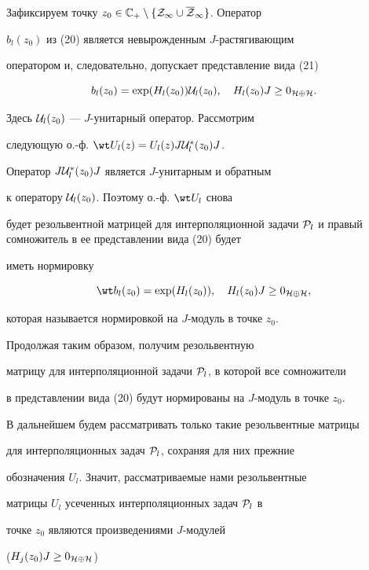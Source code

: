 Зафиксируем точку $z_0\in {\Bbb C}_+\setminus


\{{\cal Z}_{\infty }\cup \overline {\cal Z}_{\infty }\}$. Оператор


$b_l (z_0)$ из (20) является невырожденным $J$-растягивающим


оператором и, следовательно, допускает представление вида (21)


$$


b_l (z_0)=\exp (H_l (z_0)) {\cal U}_l (z_0),\quad H_l


(z_0)J\geq 0_{ {\cal H}\oplus {\cal H} }.


$$


Здесь ${\cal U}_l (z_0)$ --- $J$-унитарный оператор. Рассмотрим


следующую о.-ф. $\wt U_l(z)=U_l(z)J{\cal U}_l^* (z_0)J$.


Оператор $J{\cal U}_l^* (z_0)J$ является $J$-унитарным и обратным


к оператору ${\cal U}_l (z_0)$. Поэтому о.-ф. $\wt U_l $ снова


будет резольвентной матрицей для интерполяционной задачи ${\cal


P}_l$ и правый сомножитель в ее представлении вида (20) будет


иметь нормировку


$$


\wt b_l (z_0)=\exp (H_l (z_0)),\quad H_l (z_0)J\geq


0_{{\cal H}\oplus {\cal H} },


$$


которая называется нормировкой на $J$-модуль в точке $z_0$.


Продолжая таким образом, получим резольвентную


матрицу для интерполяционной задачи ${\cal P}_l$, в которой все сомножители


в представлении вида (20) будут нормированы на $J$-модуль в точке $z_0$.


В дальнейшем будем рассматривать только такие резольвентные матрицы


для интерполяционных задач ${\cal P}_l$, сохраняя для них прежние


обозначения ${U}_l$. Значит, рассматриваемые нами резольвентные


матрицы ${U}_l$ усеченных интерполяционных задач ${\cal P}_l$ в


точке $z_0$ являются произведениями $J$-модулей


($H_j (z_0)J\geq 0_{ {\cal H}\oplus {\cal H} }$)



